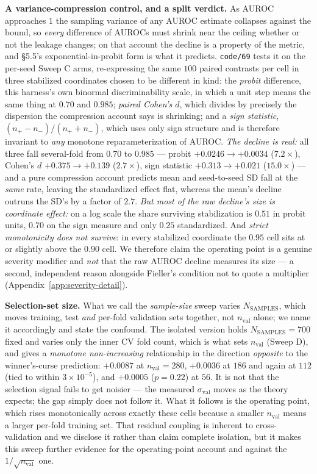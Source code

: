 \documentclass[10pt]{article} %
\begin{document}
\textbf{A variance-compression control, and a split verdict.} As AUROC
approaches $1$ the sampling variance of any AUROC estimate collapses against
the bound, so \emph{every} difference of AUROCs must shrink near the ceiling
whether or not the leakage changes; on that account the decline is a property
of the metric, and §5.5's exponential-in-probit form is what it predicts.
\texttt{code/69} tests it on the per-seed Sweep C arms, re-expressing the same
$100$ paired contrasts per cell in three stabilized coordinates chosen to be
different in kind: the \emph{probit} difference, this harness's own binormal
discriminability scale, in which a unit step means the same thing at $0.70$ and
$0.985$; \emph{paired Cohen's $d$}, which divides by precisely the dispersion
the compression account says is shrinking; and a \emph{sign statistic},
$(n_{+}-n_{-})/(n_{+}+n_{-})$, which uses only sign structure and is therefore
invariant to \emph{any} monotone reparameterization of AUROC. \emph{The decline
is real:} all three fall several-fold from $0.70$ to $0.985$ --- probit
$+0.0246\to+0.0034$ ($7.2\times$), Cohen's $d$ $+0.375\to+0.139$ ($2.7\times$),
sign statistic $+0.313\to+0.021$ ($15.0\times$) --- and a pure compression
account predicts mean and seed-to-seed SD fall at the \emph{same} rate, leaving
the standardized effect flat, whereas the mean's decline outruns the SD's
  by a factor of $2.7$. \emph{But most of the raw decline's size is coordinate
effect:} on a log scale the share surviving stabilization is $0.51$ in probit
units, $0.70$ on the sign measure and only $0.25$ standardized. And \emph{strict
monotonicity does not survive}: in every stabilized coordinate the $0.95$ cell
sits at or slightly above the $0.90$ cell. We therefore claim the operating
point is a genuine severity modifier and \emph{not} that the raw AUROC decline
measures its size --- a second, independent reason alongside Fieller's condition
not to quote a multiplier (Appendix~\ref{app:severity-detail}).

\textbf{Selection-set size.} What we call the \emph{sample-size} sweep varies
$N_{\text{SAMPLES}}$, which moves training, test \emph{and} per-fold validation
sets together, not $n_{\text{val}}$ alone; we name it accordingly and state the
confound. The isolated version holds $N_{\text{SAMPLES}}=700$ fixed and varies
only the inner CV fold count, which is what sets $n_{\text{val}}$ (Sweep D),
and gives a \emph{monotone non-increasing} relationship in the direction
\emph{opposite} to the winner's-curse prediction: $+0.0087$ at
$n_{\text{val}}=280$, $+0.0036$ at $186$ and again at $112$ (tied to within
$3\times10^{-5}$), and $+0.0005$ ($p=0.22$) at $56$. It is not that the
selection signal fails to get noisier --- the measured $\sigma_{\text{val}}$
moves as the theory expects; the gap simply does not follow it. What it follows
is the operating point, which rises monotonically across exactly these cells
because a smaller $n_{\text{val}}$ means a larger per-fold training set. That
residual coupling is inherent to cross-validation and we disclose it rather
than claim complete isolation, but it makes this sweep further evidence for the
operating-point account and against the $1/\sqrt{n_{\text{val}}}$ one.
\end{document}

